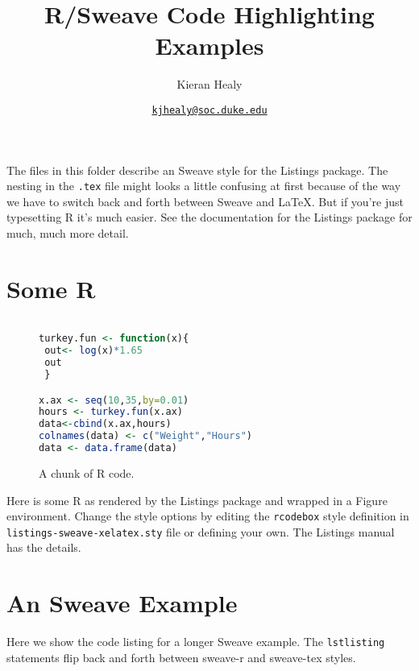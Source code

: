 \documentclass[11pt]{article}
\begin{document}
\title{R/Sweave Code Highlighting Examples}

\author{Kieran Healy}
\date{{\scriptsize{\texttt{\href{mailto:kjhealy@soc.duke.edu}{kjhealy@soc.duke.edu}}}}} 

\maketitle

The files in this folder describe an Sweave style for the Listings package. The nesting in the \texttt{.tex} file might looks a little confusing at first because of the way we have to switch back and forth between Sweave and LaTeX. But if you're just typesetting R it's much easier. See the documentation for the Listings package for much, much more detail.

\section*{Some R}

\begin{figure}[h!] %

\begin{lstlisting}[language=R,numbers=none,style=rcodebox] 

turkey.fun <- function(x){
 out<- log(x)*1.65
 out
 }

x.ax <- seq(10,35,by=0.01)
hours <- turkey.fun(x.ax)
data<-cbind(x.ax,hours)
colnames(data) <- c("Weight","Hours")
data <- data.frame(data) 
\end{lstlisting}

 \caption{A chunk of R code.}
\label{fig:rchunk}
\end{figure}

Here is some R as rendered by the Listings package and wrapped in a Figure environment. Change the style options by editing the \texttt{rcodebox} style definition in  \texttt{listings-sweave-xelatex.sty} file or defining your own. The Listings manual has the details.

\section*{An Sweave Example} %
\label{sec:an_sweave_example}
Here we show the code listing for a longer Sweave example. The \texttt{lstlisting} statements flip back and forth between sweave-r and sweave-tex styles. 
 
\end{document}
